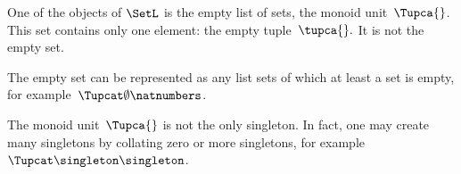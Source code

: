 
One of the objects of $\SetL$ is the empty list of sets, the monoid unit~$\Tupca{ }$.
This set contains only one element: the empty tuple~$\tupca{ }.
$
It is not the empty set.

The empty set can be represented as any list sets of which at least a set is empty, for example~$\Tupcat \emptyset \natnumbers$.

The monoid unit~$\Tupca{ }$ is not the only singleton.
In fact, one may create many singletons by collating zero or more singletons, for example~$\Tupcat \singleton \singleton$.

%

